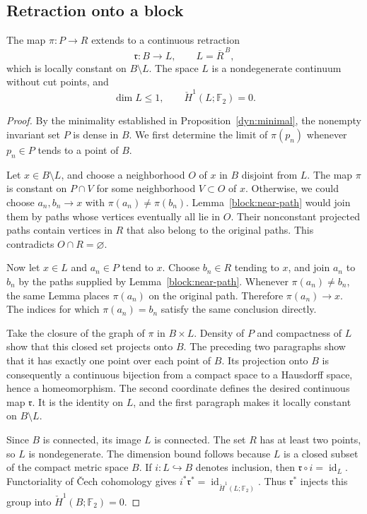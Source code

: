 \subsection{Retraction onto a block}

\begin{proposition}\label{block:retraction}
The map $\pi:P\to R$ extends to a continuous retraction
\[
  \mathfrak r:B\longrightarrow L,
  \qquad L=\overline R^{\,B},
\]
which is locally constant on $B\setminus L$.  The space $L$ is a
nondegenerate continuum without cut points, and
\[
  \dim L\leq1,
  \qquad \check H^1(L;\mathbb F_2)=0.
\]
\end{proposition}

\begin{proof}
By the minimality established in Proposition~\ref{dyn:minimal}, the
nonempty invariant set $P$ is dense in $B$.  We first determine the
limit of $\pi(p_n)$ whenever $p_n\in P$ tends to a point of $B$.

Let $x\in B\setminus L$, and choose a neighborhood $O$ of $x$ in $B$
disjoint from $L$.  The map $\pi$ is constant on $P\cap V$ for some
neighborhood $V\subset O$ of $x$.  Otherwise, we could choose
$a_n,b_n\to x$ with $\pi(a_n)\ne\pi(b_n)$.
Lemma~\ref{block:near-path} would join them by paths whose vertices
eventually all lie in $O$.  Their nonconstant projected paths contain
vertices in $R$ that also belong to the original paths.  This
contradicts $O\cap R=\varnothing$.

Now let $x\in L$ and $a_n\in P$ tend to $x$.  Choose $b_n\in R$ tending
to $x$, and join $a_n$ to $b_n$ by the paths supplied by
Lemma~\ref{block:near-path}.  Whenever $\pi(a_n)\ne b_n$, the same
Lemma places $\pi(a_n)$ on the original path.  Therefore
$\pi(a_n)\to x$.  The indices for which $\pi(a_n)=b_n$ satisfy the
same conclusion directly.

Take the closure of the graph of $\pi$ in $B\times L$.  Density of
$P$ and compactness of $L$ show that this closed set projects onto
$B$.  The preceding two paragraphs show that it has exactly one point
over each point of $B$.  Its projection onto $B$ is consequently a
continuous bijection from a compact space to a Hausdorff space, hence
a homeomorphism.  The second coordinate defines the desired
continuous map $\mathfrak r$.  It is the identity on $L$, and the
first paragraph makes it locally constant on $B\setminus L$.

Since $B$ is connected, its image $L$ is connected.  The set $R$ has at
least two points, so $L$ is nondegenerate.  The dimension bound follows
because $L$ is a closed subset of the compact metric space $B$.
If $i:L\hookrightarrow B$ denotes inclusion, then
$\mathfrak r\circ i=\operatorname{id}_L$.  Functoriality of \v Cech
cohomology gives
$i^*\mathfrak r^*=\operatorname{id}_{\check H^1(L;\mathbb F_2)}$.
Thus $\mathfrak r^*$ injects this group into
$\check H^1(B;\mathbb F_2)=0$.


\end{proof}
